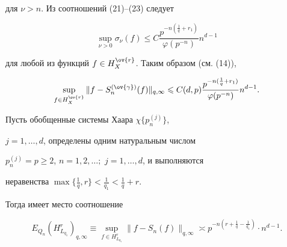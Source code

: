 для $\nu>n$. Из соотношений (21)--(23) следует


$$


\sup_{\nu>0}\sigma_{\nu}(f)\le C\frac{p^{-n(\frac{1}{q}+r_{1})}}{\varphi


(p^{-n})}n^{d-1}


$$ 


для любой из функций $f\in H_{X}^{\ov{r}}$. Таким образом (см. (14)),


$$


\sup_{f\in H_{X}^{\ov{r}}}\|f-S_{n}^{(\ov{\gamma})}(f)\|_{q,\infty}\le 


C(d,p)\frac{p^{-n(\frac{1}{q}+r_{1})}}{\varphi(p^{-n})}n^{d-1}.


$$ 








\begin{thm}


Пусть обобщенные системы Хаара $\chi\{p_{n}^{(j)}\}$, 


$j=1,\dotsc,d$, определены одним натуральным числом


$p_{n}^{(j)}=p\geq 2$, $n=1,2,\dotsc;$ $j=1,\dotsc,d$, и  выполняются 


неравенства $\max\big\{\frac{1}{q},r\big\}<\frac{1}{q_{1}}<\frac{1}{q}+r$. 


Тогда имеет место соотношение


$$


E_{Q_{n}}(H_{L_{q_{1}}}^{r})_{q,\infty}\equiv \sup_{f\in 


H_{L_{q_{1}}}^{r}}\|f-S_{n}(f)\|_{q,\infty}\asymp 


p^{-n(r+\frac{1}{q}-\frac{1}{q_{1}})}\cdot n^{d-1}.


$$


\end{thm}








